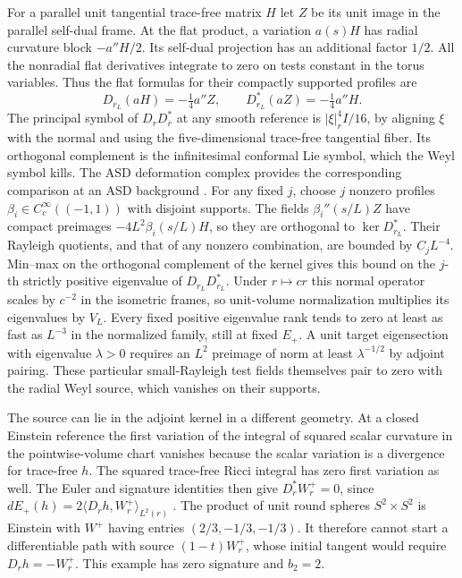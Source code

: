 \documentclass[11pt]{article}
\numberwithin{equation}{section}
\theoremstyle{definition}
\theoremstyle{remark}
\begin{document}
For a parallel unit tangential trace-free matrix \(H\) let \(Z\) be
its unit image in the parallel self-dual frame. At the flat product,
a variation \(a(s)H\) has radial curvature block \(-a''H/2\).
Its self-dual projection has an additional factor \(1/2\). All the
nonradial flat derivatives integrate to zero on tests constant in the
torus variables. Thus the flat formulas for their compactly supported
profiles are
\[
 D_{r_L}(aH)=-\tfrac14 a''Z,\qquad
 D_{r_L}^*(aZ)=-\tfrac14 a''H .
\]
The principal symbol of \(D_rD_r^*\) at any smooth reference is
\(|\xi|_r^4 I/16\), by aligning \(\xi\) with the normal and using the
five-dimensional trace-free tangential fiber. Its orthogonal complement
is the infinitesimal conformal Lie symbol, which the Weyl symbol kills.
The ASD deformation complex provides the corresponding comparison at
an ASD background \cite[\S1.1]{GoverGursky2024}.
For any fixed \(j\), choose \(j\) nonzero profiles
\(\beta_i\in C_c^\infty((-1,1))\) with disjoint supports. The fields
\(\beta_i''(s/L)Z\) have compact preimages
\(-4L^2\beta_i(s/L)H\), so they are orthogonal to \(\ker D_{r_L}^*\).
Their Rayleigh quotients, and that of any nonzero combination, are bounded
by \(C_j L^{-4}\). Min--max on the orthogonal complement of the kernel
gives this bound on the \(j\)-th strictly positive eigenvalue of
\(D_{r_L}D_{r_L}^*\). Under \(r\mapsto c r\) this normal operator scales
by \(c^{-2}\) in the isometric frames, so unit-volume normalization
multiplies its eigenvalues by \(V_L\). Every fixed positive eigenvalue
rank tends to zero at least as fast as \(L^{-3}\) in the normalized
family, still at fixed \(E_+\). A unit target eigensection with eigenvalue
\(\lambda>0\) requires an \(L^2\) preimage of norm at least
\(\lambda^{-1/2}\) by adjoint pairing. These particular small-Rayleigh
test fields themselves pair to zero with the radial Weyl source,
which vanishes on their supports.

The source can lie in the adjoint kernel in a different geometry.
At a closed Einstein reference the first variation of the integral
of squared scalar curvature in the pointwise-volume chart vanishes because
the scalar variation is a divergence for trace-free \(h\). The
squared trace-free Ricci integral has zero first variation as well.
The Euler and signature identities then give
\(D_r^*W_r^+=0\), since
\(dE_+(h)=2\langle D_rh,W_r^+\rangle_{L^2(r)}\)
\cite[(0.4) and Remark 2]{ChangGurskyYang2003}.
The product of unit round spheres \(S^2\times S^2\) is Einstein with
\(W^+\) having entries \((2/3,-1/3,-1/3)\).
It therefore cannot start a differentiable path with source
\((1-t)W_r^+\), whose initial tangent would require \(D_r h=-W_r^+\).
This example has zero signature and \(b_2=2\).
\end{document}
